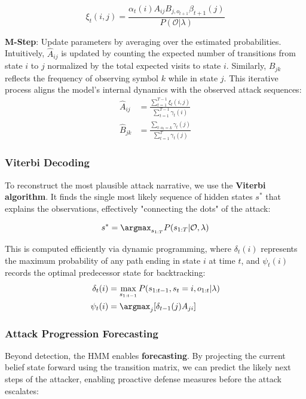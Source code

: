 \documentclass[conference]{IEEEtran}
\begin{document}
\begin{equation}
\xi_t(i,j) = \frac{\alpha_t(i) A_{ij} B_{j,o_{t+1}} \beta_{t+1}(j)}{P(\mathcal{O}|\lambda)}
\end{equation}

\textbf{M-Step}: Update parameters by averaging over the estimated probabilities. Intuitively, $\hat{A}_{ij}$ is updated by counting the expected number of transitions from state $i$ to $j$ normalized by the total expected visits to state $i$. Similarly, $\hat{B}_{jk}$ reflects the frequency of observing symbol $k$ while in state $j$. This iterative process aligns the model's internal dynamics with the observed attack sequences:
\begin{align}
\hat{A}_{ij} &= \frac{\sum_{t=1}^{T-1} \xi_t(i,j)}{\sum_{t=1}^{T-1} \gamma_t(i)} \\
\hat{B}_{jk} &= \frac{\sum_{t:o_t=k} \gamma_t(j)}{\sum_{t=1}^{T} \gamma_t(j)}
\end{align}

\subsubsection{Viterbi Decoding}
To reconstruct the most plausible attack narrative, we use the \textbf{Viterbi algorithm}. It finds the single most likely sequence of hidden states $s^*$ that explains the observations, effectively "connecting the dots" of the attack:

\begin{equation}
s^* = \argmax_{s_{1:T}} P(s_{1:T} | \mathcal{O}, \lambda)
\end{equation}

This is computed efficiently via dynamic programming, where $\delta_t(i)$ represents the maximum probability of any path ending in state $i$ at time $t$, and $\psi_t(i)$ records the optimal predecessor state for backtracking:
\begin{align}
\delta_t(i) &= \max_{s_{1:t-1}} P(s_{1:t-1}, s_t=i, o_{1:t} | \lambda) \\
\psi_t(i) &= \argmax_j [\delta_{t-1}(j) A_{ji}]
\end{align}

\subsubsection{Attack Progression Forecasting}
Beyond detection, the HMM enables \textbf{forecasting}. By projecting the current belief state forward using the transition matrix, we can predict the likely next steps of the attacker, enabling proactive defense measures before the attack escalates:
\end{document}
